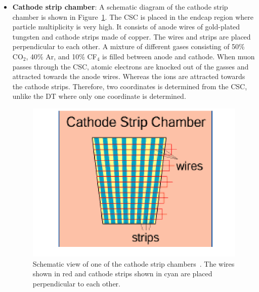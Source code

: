 \begin{itemize}[leftmargin=*]
\item \textbf{Cathode strip chamber}: A schematic diagram of the cathode strip
	chamber is shown in Figure~\ref{fig:cms_csc}. The CSC is placed in the
	endcap region where particle multiplicity is very high. It consists
	of anode wires of gold-plated tungsten and cathode strips made of copper. 
	The wires and strips are placed perpendicular to each other. A 
	mixture of different gases consisting of 50\% CO$_2$, 40\% Ar, and 10\% 
	CF$_4$ is filled between anode and cathode. When muon passes
	through the CSC, atomic electrons are knocked out of the gasses and attracted
	towards the anode wires. Whereas the ions are attracted towards the cathode
	strips. Therefore, two coordinates is determined from the CSC,
	unlike the DT where only one coordinate is determined. 
\begin{figure}
\centering
\includegraphics[width=0.50\linewidth]{Experiment/CMS/Image/CSC.png}
\caption{Schematic view of one of the cathode strip chambers~\cite{Collaboration_2008_CMS}. 
	The wires shown in red and cathode strips shown in cyan are placed perpendicular to each
	other.}
\label{fig:cms_csc}
\end{figure}


\end{itemize}
